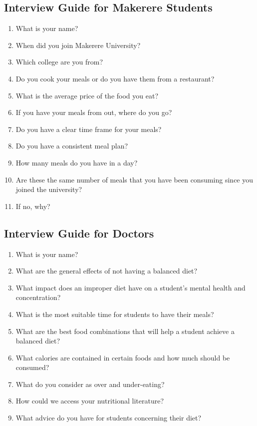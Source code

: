 \documentclass{article}
\begin{document}
\subsection{Interview Guide for Makerere Students}
\begin{enumerate}
\item What is your name?
\item When did you join Makerere University?
\item Which college are you from?
\item Do you cook your meals or do you have them from a restaurant?
\item What is the average price of the food you eat?
\item If you have your meals from out, where do you go?
\item Do you have a clear time frame for your meals?
\item Do you have a consistent meal plan?
\item How many meals do you have in a day?
\item Are these the same number of meals that you have been consuming since you joined the university?
\item If no, why?
\end{enumerate}

\subsection{Interview Guide for Doctors}
\begin{enumerate}
\item What is your name?
\item What are the general effects of not having a balanced diet?
\item What impact does an improper diet have on a student’s mental health and concentration?
\item What is the most suitable time for students to have their meals?
\item What are the best food combinations that will help a student achieve a balanced diet?
\item What calories are contained in certain foods and how much should be consumed?
\item What do you consider as over and under-eating?
\item How could we access your nutritional literature?
\item What advice do you have for students concerning their diet?
\end{enumerate}
\end{document}
